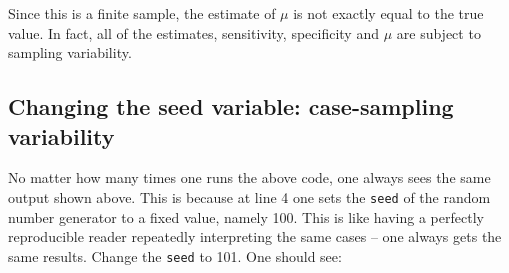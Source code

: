 \documentclass[
]{book}
\newenvironment{Shaded}{\begin{snugshade}}{\end{snugshade}}
\newcommand{\CharTok}[1]{\textcolor[rgb]{0.31,0.60,0.02}{#1}}
\newcommand{\CommentTok}[1]{\textcolor[rgb]{0.56,0.35,0.01}{\textit{#1}}}
\newcommand{\DecValTok}[1]{\textcolor[rgb]{0.00,0.00,0.81}{#1}}
\newcommand{\FloatTok}[1]{\textcolor[rgb]{0.00,0.00,0.81}{#1}}
\newcommand{\KeywordTok}[1]{\textcolor[rgb]{0.13,0.29,0.53}{\textbf{#1}}}
\newcommand{\NormalTok}[1]{#1}
\newcommand{\OperatorTok}[1]{\textcolor[rgb]{0.81,0.36,0.00}{\textbf{#1}}}
\newcommand{\StringTok}[1]{\textcolor[rgb]{0.31,0.60,0.02}{#1}}
\begin{document}
\begin{Shaded}
\end{Shaded}

Since this is a finite sample, the estimate of \(\mu\) is not exactly equal to the true value. In fact, all of the estimates, sensitivity, specificity and \(\mu\) are subject to sampling variability.

\hypertarget{changing-the-seed-variable-case-sampling-variability}{%
\subsection{Changing the seed variable: case-sampling variability}\label{changing-the-seed-variable-case-sampling-variability}}

No matter how many times one runs the above code, one always sees the same output shown above. This is because at line 4 one sets the \texttt{seed} of the random number generator to a fixed value, namely 100. This is like having a perfectly reproducible reader repeatedly interpreting the same cases -- one always gets the same results. Change the \texttt{seed} to 101. One should see:
\end{document}
